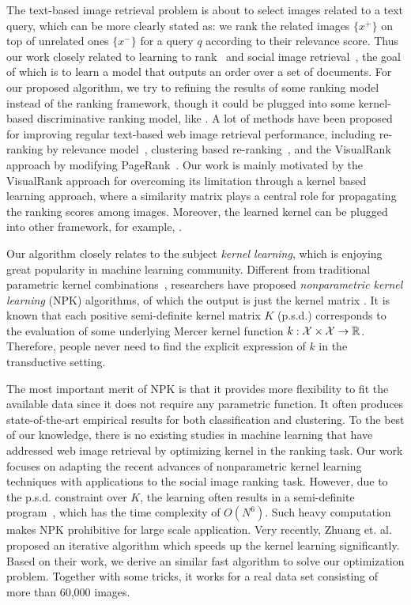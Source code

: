 The text-based image retrieval problem is about to select images related to
a text query, which can be more clearly stated as: we rank the related
images $\{x^+\}$ on top of unrelated ones $\{x^-\}$ for a query $q$
according to their relevance score. Thus our work closely related to
learning to
rank~\cite{kdd/Joachims02,icml/BurgesSRLDHH05,nips/BurgesRL06,icml/CaoQLTL07,pami/GrangierB08}
and social image
retrieval~\cite{WIR03,MM04Cai,pami/JingB08,pami/GrangierB08,mm/HeLZTZ04,mm/DattaGLW06},
the goal of which is to learn a model that outputs an order over a set of
documents. For our proposed algorithm, we try to refining the results of
some ranking model instead of the ranking framework, though it could be
plugged into some kernel-based discriminative ranking model, like
\cite{pami/GrangierB08}. A lot of methods have been proposed for
improving regular text-based web image retrieval performance, including
re-ranking by relevance model~\cite{WIR03}, clustering based
re-ranking~\cite{MM04Cai}, and the VisualRank approach by modifying
PageRank~\cite{pami/JingB08}. Our work is mainly motivated by the
VisualRank approach for overcoming its limitation through a kernel based
learning approach, where a similarity matrix plays a central role for
propagating the ranking scores among images. Moreover, the learned
kernel can be plugged into other framework, for example,
\cite{pami/GrangierB08}.

Our algorithm closely relates to the subject {\em kernel
learning}\cite{jmlr/LanckrietCBGJ03}, which is enjoying great popularity
in machine learning community. Different from traditional parametric
kernel combinations~\cite{jmlr/LanckrietCBGJ03}, researchers have
proposed {\em nonparametric kernel learning} (NPK) algorithms, of
which the output is just the kernel matrix
\cite{icml/KulisSD06,icml/HoiJL07, icml/ZhuangTH09}. It is known that
each positive semi-definite kernel matrix $K$ (p.s.d.) corresponds to the
evaluation of some underlying Mercer kernel function $k: {\mathcal X} \times {\mathcal X}
\rightarrow {\mathbb R}$. Therefore, people never need to find the explicit
expression of $k$ in the transductive setting.

The most important merit of NPK is that it provides more flexibility to fit
the available data since it does not require any parametric function. It
often produces state-of-the-art empirical results for both classification and
clustering. To the best of our knowledge, there is no existing studies in
machine learning that have addressed web image retrieval by optimizing
kernel in the ranking task. Our work focuses on adapting the recent
advances of nonparametric kernel learning techniques with applications to
the social image ranking task. However, due to the p.s.d. constraint over
$K$, the learning often results in a semi-definite program~\cite{Boyd},
which has the time complexity of $O(N^6)$. Such heavy computation
makes NPK prohibitive for large scale application. Very recently, Zhuang
et. al. proposed an iterative algorithm which speeds up the kernel learning
significantly. Based on their work,  we derive an similar fast algorithm to
solve our optimization problem. Together with some tricks, it works for a
real data set consisting of more than 60,000 images.

